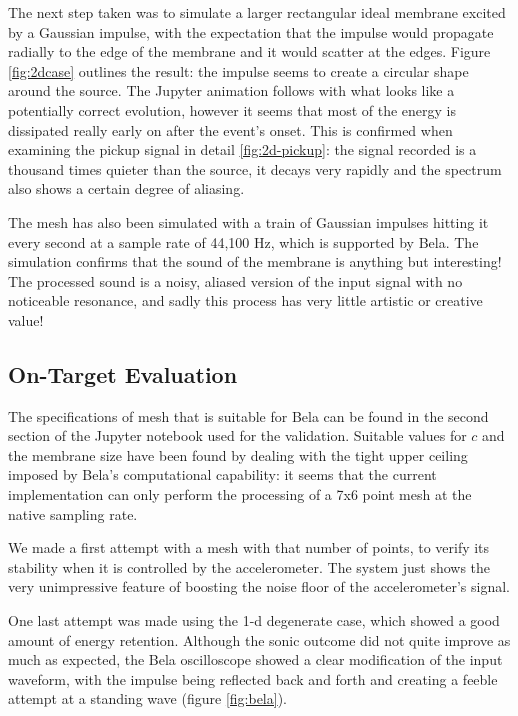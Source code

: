 \documentclass{article}
\begin{document}
The next step taken was to simulate a larger rectangular ideal
membrane excited by a Gaussian impulse, with the expectation
that the impulse would propagate radially to the edge
of the membrane and it would scatter at the edges. Figure
\ref{fig:2dcase} outlines the result: the impulse seems to create
a circular shape around the source. The Jupyter animation follows with
what looks like a potentially correct evolution, however
it seems that most of the energy is dissipated really early on
after the event's onset. This is confirmed when examining the pickup
signal in detail \ref{fig:2d-pickup}: the signal recorded is
a thousand times quieter than the source, it decays very rapidly
and the spectrum also shows a certain degree of aliasing.

The mesh has also been simulated with a train of Gaussian
impulses hitting it every second at a sample rate of 44,100 Hz,
which is supported by Bela. The simulation confirms that the
sound of the membrane is anything but interesting! The
processed sound is a noisy, aliased version of the input signal
with no noticeable resonance, and sadly this process has very little
artistic or creative value!

\subsection{On-Target Evaluation}

The specifications of mesh that is suitable for Bela can be
found in the second section of the Jupyter notebook used for the
validation.
Suitable values for \(c\) and the membrane size have been
found by dealing with the tight upper ceiling imposed by Bela's
computational capability: it seems that the current implementation
can only perform the processing of
a 7x6 point mesh at the native sampling rate.

We made a first attempt with a mesh with that number of points,
to verify its stability
when it is controlled by the accelerometer. The system
just shows the very unimpressive feature of boosting
the noise floor of the accelerometer's signal. 

One last attempt was made using the 1-d degenerate case,
which showed a good amount of energy retention. Although the
sonic outcome did not quite improve as much as expected,
the Bela oscilloscope showed a clear modification of the
input waveform, with the impulse being reflected back
and forth and creating a feeble attempt at a standing wave
(figure \ref{fig:bela}).
\end{document}
